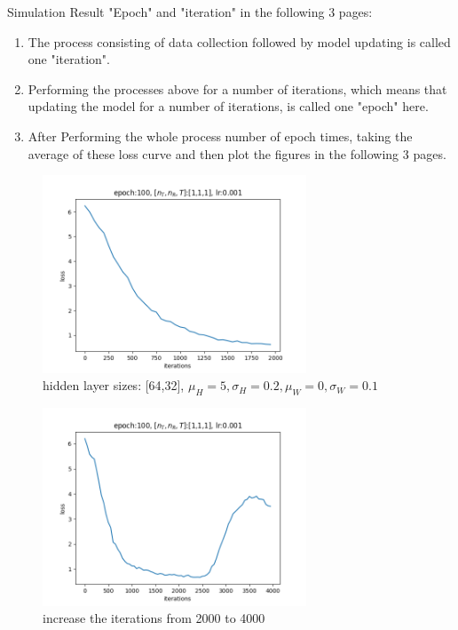 \documentclass[hyperref={bookmarks=false}]{beamer}
\numberwithin{figure}{section}
\begin{document}
\begin{frame}[allowframebreaks]{Simulation Result}
"Epoch" and "iteration" in the following 3 pages:\\
\begin{enumerate}
    \item The process consisting of data collection followed
        by model updating is called one "iteration".\\
    \item Performing the processes above for a number of 
        iterations, which means that updating the model for a 
        number of iterations, is called one "epoch" here.\\
    \item After Performing the whole process number of 
        epoch times, taking the average of these loss curve 
        and then plot the figures in the following 3 pages. 
\end{enumerate}


\framebreak

\begin{figure}[h]
    \includegraphics[width=0.7\textwidth]{figures/240314/Figure_1.png}
    \caption{hidden layer sizes: [64,32], $\mu_H=5, \sigma_H=0.2, \mu_W=0, \sigma_W=0.1 $}
\end{figure}

\framebreak

\begin{figure}
    \includegraphics[width=0.7\textwidth]{figures/240314/Figure_2.png}
    \caption{increase the iterations from 2000 to 4000}
\end{figure}


\end{frame}
\end{document}
